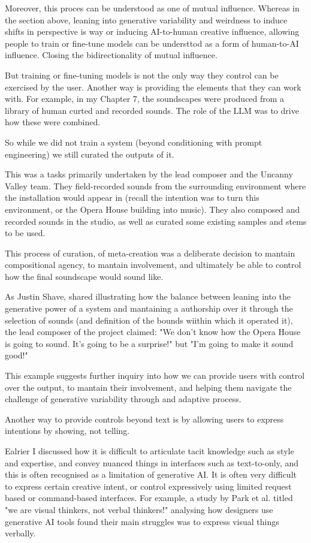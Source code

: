 Moreover, this proces can be understood as one of mutual influence. Whereas in the section above, leaning into generative variability and weirdness to induce shifts in perspective is way or inducing AI-to-human creative influence, allowing people to train or fine-tune models can be understtod as a form of human-to-AI influence. Closing the bidirectionality of mutual influence. 

But training or fine-tuning models is not the only way they control can be exercised by the user. Another way is providing the elements that they can work with. For example, in my Chapter 7, the soundscapes were produced from a library of human curted and recorded sounds. The role of the LLM was to drive how these were combined. 

So while we did not train a system (beyond conditioning with prompt engineering) we still curated the outputs of it. 

This was a tasks primarily undertaken by the lead composer and the Uncanny Valley team. They field-recorded sounds from the surrounding environment where the installation would appear in (recall the intention was to turn this environment, or the Opera House building into music). They also composed and recorded sounds in the studio, as well as curated some existing samples and stems to be used. 

This process of curation, of meta-creation was a deliberate decision to mantain compositional agency, to mantain involvement, and ultimately be able to control how the final soundscape would sound like. 

As Justin Shave, shared illustrating how the balance between leaning into the generative power of a system and mantaining a authorship over it through the selection of sounds (and definition of the bounds wiithin which it operated it), the lead composer of the project claimed: "We don't know how the Opera House is going to sound. It's going to be a surprise!" but "I'm going to make it sound good!"

This example suggests further inquiry into how we can provide users with control over the output, to mantain their involvement, and helping them navigate the challenge of generative variability through and adaptive process. 

Another way to provide controls beyond text is by allowing users to express intentions by showing, not telling.

Ealrier I discussed how it is difficult to articulate tacit knowledge such as style and expertise, and convey nuanced things in interfaces such as text-to-only, and this is often recognised as a limitation of generative AI. It is often very difficult to express certain creative intent, or control expressively using limited request based or command-based interfaces. For example, a study by Park et al. \cite{Park2024-gw} titled "we are visual thinkers, not verbal thinkers!" analysing how designers use generative AI tools found their main struggles was to express visual things verbally.


